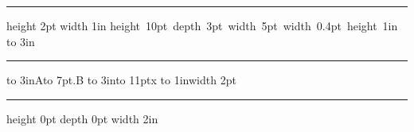  
\hrule height 2pt width 1in
\vskip 4pt \hbox{\vrule height 10pt depth 3pt width 5pt \vrule width 0.4pt height 1in}
\hbox to 3in{\leaders\hrule\hfil}
\hbox to 3in{A\leaders\hbox to 7pt{\hss.\hss}\hfil B}
\hbox to 3in{\xleaders\hbox to 11pt{x\hss}\hfil}
\vbox to 1in{\leaders\vrule width 2pt\vfil}
\hrule height 0pt depth 0pt width 2in \bye
